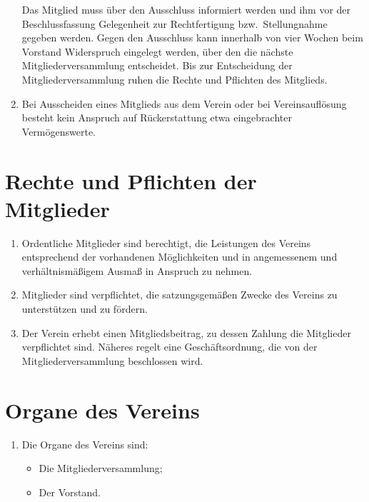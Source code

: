 \documentclass[fontsize=12pt,paper=a4,pagesize,headings=small]{scrartcl}
\begin{document}
\begin{enumerate}
    Das Mitglied muss über den Ausschluss informiert werden und ihm vor der
    Beschlussfassung Gelegenheit zur Rechtfertigung bzw.\ Stellungnahme
    gegeben werden. Gegen den Ausschluss kann innerhalb von vier Wochen
    beim Vorstand Widerspruch eingelegt werden, über den die nächste
    Mitgliederversammlung entscheidet. Bis zur Entscheidung der
    Mitgliederversammlung ruhen die Rechte und Pflichten des Mitglieds.

    \item Bei Ausscheiden eines Mitglieds aus dem Verein oder bei
    Vereinsauflösung besteht kein Anspruch auf Rückerstattung etwa
    eingebrachter Vermögenswerte.
\end{enumerate}

\section{Rechte und Pflichten der Mitglieder}

\begin{enumerate}
    \item Ordentliche Mitglieder sind berechtigt, die Leistungen des
        Vereins entsprechend der vorhandenen Möglichkeiten und in angemessenem und verhältnismäßigem Ausmaß in Anspruch zu nehmen.

    \item Mitglieder sind verpflichtet, die satzungsgemäßen Zwecke des
        Vereins zu unterstützen und zu fördern.

    \item Der Verein erhebt einen Mitgliedsbeitrag, zu dessen Zahlung die
        Mitglieder verpflichtet sind. Näheres regelt eine Geschäftsordnung,
        die von der Mitgliederversammlung beschlossen wird.
\end{enumerate}

\section{Organe des Vereins}
\begin{enumerate}
    \item Die Organe des Vereins sind:
        \begin{itemize}
            \item Die Mitgliederversammlung;
            \item Der Vorstand.
        \end{itemize}
\end{enumerate}
\end{document}
